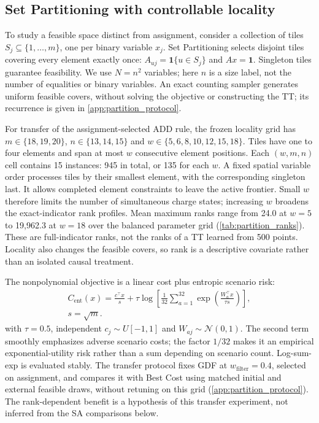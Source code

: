 \subsection{Set Partitioning with controllable locality}
\label{subsec:partition_benchmark}
To study a feasible space distinct from assignment, consider a collection
of tiles $S_j\subseteq\{1,\ldots,m\}$, one per binary variable $x_j$.
Set Partitioning selects disjoint tiles covering every element exactly once:
$A_{uj}=\mathbf1\{u\in S_j\}$ and $Ax=\mathbf1$.
Singleton tiles guarantee feasibility. We use $N=n^2$ variables; here $n$
is a size label, not the number of equalities or binary variables.
An exact counting sampler generates uniform feasible covers, without solving
the objective or constructing the TT; its recurrence is given in
\cref{app:partition_protocol}.

For transfer of the assignment-selected ADD rule, the frozen locality grid
has $m\in\{18,19,20\}$, $n\in\{13,14,15\}$ and
$w\in\{5,6,8,10,12,15,18\}$. Tiles have one to four elements and span at most
$w$ consecutive element positions. Each $(w,m,n)$ cell contains 15 instances:
945 in total, or 135 for each $w$. A fixed spatial variable order processes
tiles by their smallest element, with the corresponding singleton last.
It allows completed element constraints to leave the active frontier.
Small $w$ therefore limits the number of simultaneous charge states; increasing
$w$ broadens the exact-indicator rank profiles. Mean maximum ranks range from
24.0 at $w=5$ to 19,962.3 at $w=18$ over the balanced parameter grid
(\cref{tab:partition_ranks}). These are full-indicator ranks, not the ranks
of a TT learned from 500 points. Locality also changes the feasible covers,
so rank is a descriptive covariate rather than an isolated causal treatment.

The nonpolynomial objective is a linear cost plus entropic scenario risk:
\begin{equation}
\begin{aligned}
C_{\mathrm{ent}}(x)=\frac{c^\top x}{s}
 +\tau\log\left[\frac1{32}\sum_{a=1}^{32}
 \exp\left(\frac{W_a^\top x}{\tau s}\right)\right],\\
 s=\sqrt m.
\end{aligned}
\label{eq:partition_entropic}
\end{equation}
with $\tau=0.5$, independent $c_j\sim U[-1,1]$ and
$W_{aj}\sim\mathcal N(0,1)$. The second term smoothly emphasizes adverse
scenario costs; the factor $1/32$ makes it an empirical exponential-utility
risk rather than a sum depending on scenario count. Log-sum-exp is evaluated
stably. The transfer protocol fixes GDF at $w_{\mathrm{filter}}=0.4$, selected
on assignment, and compares it with Best Cost using matched initial and
external feasible draws, without retuning on this grid
(\cref{app:partition_protocol}). The rank-dependent benefit is a hypothesis
of this transfer experiment, not inferred from the SA comparisons below.

